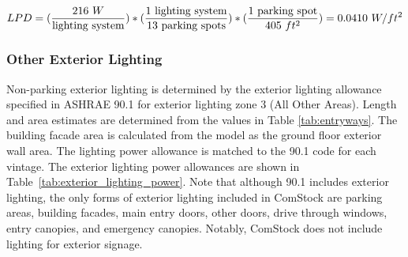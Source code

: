 \begin{align}
\label{ext_light_eqn}
LPD = ({216\ W \over \text{lighting system}}) * ({1\ \text{lighting system} \over 13\ \text{parking spots}}) * ({1\ \text{parking spot} \over 405\ ft\textsuperscript{2}}) = 0.0410\ W/ft\textsuperscript{2}
\end{align}

%

\subsubsection{Other Exterior Lighting}
Non-parking exterior lighting is determined by the exterior lighting allowance specified in ASHRAE 90.1 for exterior lighting zone 3 (All Other Areas). Length and area estimates are determined from the values in Table \ref{tab:entryways}. The building facade area is calculated from the model as the ground floor exterior wall area. The lighting power allowance is matched to the 90.1 code for each vintage. The exterior lighting power allowances are shown in Table~\ref{tab:exterior_lighting_power}. Note that although 90.1 includes exterior lighting, the only forms of exterior lighting included in ComStock are parking areas, building facades, main entry doors, other doors, drive through windows, entry canopies, and emergency canopies. Notably, ComStock does not include lighting for exterior signage.

%
